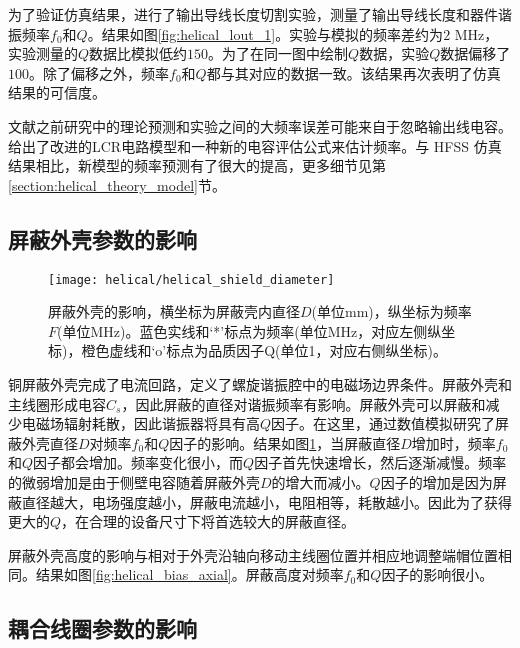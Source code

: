 为了验证仿真结果，进行了输出导线长度切割实验，测量了输出导线长度和器件谐振频率$f_0$和$Q$。结果如图\ref{fig:helical_lout_1}。实验与模拟的频率差约为$2$ MHz，实验测量的$Q$数据比模拟低约$150$。为了在同一图中绘制$ Q $数据，实验$ Q $数据偏移了$ 100$。除了偏移之外，频率$f_0$和$ Q $都与其对应的数据一致。该结果再次表明了仿真结果的可信度。

文献\cite[]{Gandolfi_Niedermayr_Kumph_Brownnutt_Blatt_2012,Macalpine_Schildknecht_1959, Deng_Sun_Yuan_Xu_Zhang_Lu_Luo_2014}之前研究中的理论预测和实验之间的大频率误差可能来自于忽略输出线电容\cite[]{Nandi_Sikdar_Das_Ray_2022, Batra_Panja_De_Roy_Majhi_Yadav_Sen_Gupta_2017}。给出了改进的LCR电路模型和一种新的电容评估公式来估计频率。与 HFSS 仿真结果相比，新模型的频率预测有了很大的提高，更多细节见第\ref{section:helical_theory_model}节。

\subsection[屏蔽外壳参数的影响]{屏蔽外壳参数的影响}
\begin{figure}
    \centering
    \texttt{[image: helical/helical\_shield\_diameter]}
    \caption[屏蔽外壳的影响]{屏蔽外壳的影响，横坐标为屏蔽壳内直径$D$(单位mm)，纵坐标为频率$F$(单位MHz)。蓝色实线和‘*’标点为频率(单位MHz，对应左侧纵坐标)，橙色虚线和‘o’标点为品质因子Q(单位1，对应右侧纵坐标)。\label{fig:helical_shield_diameter}}
\end{figure}

铜屏蔽外壳完成了电流回路，定义了螺旋谐振腔中的电磁场边界条件。屏蔽外壳和主线圈形成电容$C_s$，因此屏蔽的直径对谐振频率有影响。屏蔽外壳可以屏蔽和减少电磁场辐射耗散，因此谐振器将具有高$Q$因子。在这里，通过数值模拟研究了屏蔽外壳直径$ D $对频率$f_0$和$ Q $因子的影响。结果如图\ref{fig:helical_shield_diameter}，当屏蔽直径$ D $增加时，频率$f_0$和$ Q $因子都会增加。频率变化很小，而$ Q $因子首先快速增长，然后逐渐减慢。频率的微弱增加是由于侧壁电容随着屏蔽外壳$D$的增大而减小。$Q$因子的增加是因为屏蔽直径越大，电场强度越小，屏蔽电流越小，电阻相等，耗散越小。因此为了获得更大的$Q$，在合理的设备尺寸下将首选较大的屏蔽直径。

屏蔽外壳高度的影响与相对于外壳沿轴向移动主线圈位置并相应地调整端帽位置相同。结果如图\ref{fig:helical_bias_axial}。屏蔽高度对频率$f_0$和$Q$因子的影响很小。

\subsection[耦合线圈参数的影响]{耦合线圈参数的影响}

